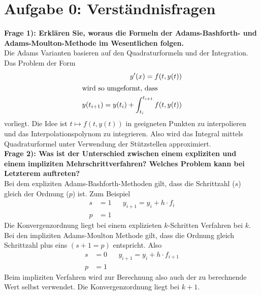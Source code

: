 \section*{Aufgabe 0: Verständnisfragen}

\textbf{Frage 1): Erklären Sie, woraus die Formeln der Adams-Bashforth- und Adams-Moulton-Methode im Wesentlichen
folgen. }\\ Die Adams Varianten basieren auf den Quadraturformeln und der Integration. Das Problem der Form
\begin{align*}
  y'(x)=f(t,y(t)) \\
\intertext{wird so umgeformt, dass}
  y(t_{i+1}) = y(t_i)+\int_{t_i}^{t_{i+1}} f(t,y(t))
\end{align*}
vorliegt. Die Idee ist $t \mapsto f(t,y(t))$ in geeigneten Punkten zu interpolieren und das Interpolationspolynom zu integrieren.
Also wird das Integral mittels Quadraturformel unter Verwendung der Stützstellen approximiert.\\

\textbf{Frage 2): Was ist der Unterschied zwischen einem expliziten und einem impliziten Mehrschrittverfahren?
Welches Problem kann bei Letzterem auftreten? }\\
Bei dem expliziten Adams-Bashforth-Methoden gilt, dass die Schrittzahl ($s$) gleich der Ordnung ($p$) ist. Zum Beispiel
\begin{align*}
  s&=1 && y_{i+1}=y_i+h\cdot f_{i} \\
  p&=1
\end{align*}
Die Konvergenzordnung liegt bei einem explizieten $k$-Schritten Verfahren bei $k$.
Bei den impliziten Adams-Moulton Methode gilt, dass die Ordnung gleich Schrittzahl plus eins $(s+1=p)$ entspricht.
Also
\begin{align*}
  s&=0 && y_{i+1}=y_i+h\cdot f_{i+1} \\
  p&=1
\end{align*}
Beim impliziten Verfahren wird zur Berechnung also auch der zu berechnende Wert selbst verwendet.
Die Konvergenzordnung liegt bei $k+1$.
